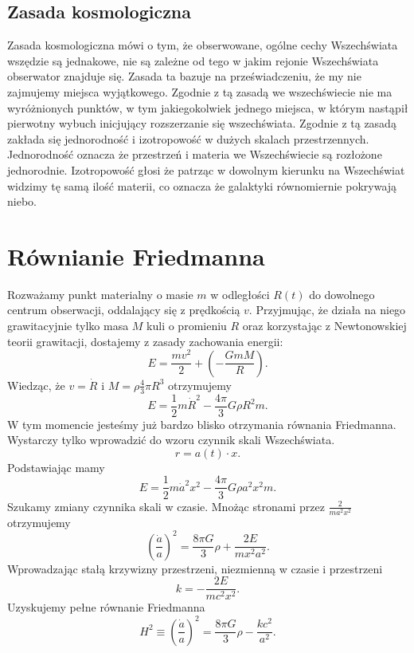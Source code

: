 \documentclass[12pt]{article}
\begin{document}
	\subsection{Zasada kosmologiczna}
	Zasada kosmologiczna mówi o tym, że obserwowane, ogólne cechy Wszechświata wszędzie są jednakowe, nie są zależne od tego w jakim rejonie Wszechświata obserwator znajduje się. Zasada ta bazuje na przeświadczeniu, że my nie zajmujemy miejsca wyjątkowego.
	Zgodnie z tą zasadą we wszechświecie nie ma wyróżnionych punktów, w tym jakiegokolwiek jednego miejsca, w którym nastąpił pierwotny wybuch inicjujący rozszerzanie się wszechświata.
	Zgodnie z tą zasadą zakłada się jednorodność i izotropowość w dużych skalach przestrzennych\cite{ZasadaKosm}.\\
	Jednorodność oznacza że przestrzeń i materia we Wszechświecie są rozłożone jednorodnie. Izotropowość głosi że patrząc w dowolnym kierunku na Wszechświat widzimy tę samą ilość materii, co oznacza że galaktyki równomiernie pokrywają niebo.
	
	\section{Równianie Friedmanna}
	Rozważamy punkt materialny o masie $m$ w odległości $R(t)$ do dowolnego centrum obserwacji, oddalający się z prędkością $v$. Przyjmując, że działa na niego grawitacyjnie tylko masa $M$ kuli o promieniu $R$ oraz korzystając z Newtonowskiej teorii grawitacji, dostajemy z zasady zachowania energii: 
	\begin{equation}
		E = \frac{m v^2}{2} + \left(-\frac{GmM}{R}\right) .
	\end{equation}
	Wiedząc, że $v = \dot{R}$ i $M = \rho \frac{4}{3} \pi R^3$ otrzymujemy
	\begin{equation}
		E = \frac{1}{2}m\dot{R}^2 - \frac{4\pi}{3} G\rho R^2 m.
	\end{equation}
	W tym momencie jesteśmy już bardzo blisko otrzymania równania Friedmanna. Wystarczy tylko wprowadzić do wzoru czynnik skali Wszechświata.
	\begin{equation}
		r = a(t)\cdot x.
	\end{equation}
	Podstawiając mamy
	\begin{equation}
		E = \frac{1}{2} m \dot{a}^2 x^2 - \frac{4\pi}{3} G \rho a^2 x^2 m.
	\end{equation}
	Szukamy zmiany czynnika skali w czasie. Mnożąc stronami przez $\frac{2}{ma^2x^2}$ otrzymujemy
	\begin{equation}
		\left(\frac{\dot{a}}{a}\right) ^ 2 = \frac{8\pi G }{3}\rho + \frac{2E}{mx^2a^2}.
	\end{equation}
	Wprowadzając stałą krzywizny przestrzeni, niezmienną w czasie i przestrzeni 
	\begin{equation}
		k = - \frac{2E}{mc^2x^2}.
	\end{equation}
	Uzyskujemy pełne równanie Friedmanna
	\begin{equation}
		H^2 \equiv \left(\frac{\dot{a}}{a}\right)^2 = \frac{8\pi G}{3}\rho - \frac{k c^2}{a^2} .
	\end{equation}
	
\end{document}
